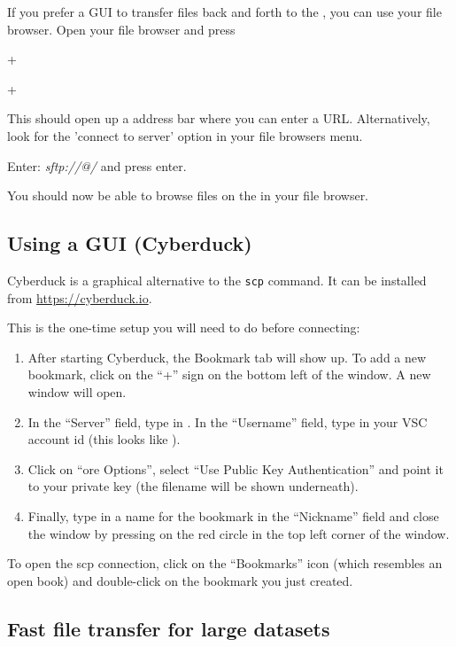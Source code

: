  If you prefer a GUI to transfer files back and forth to the \hpc, you can use your file browser.
  Open your file browser  and press

  \iflinux
     + 
  \fi

  \ifmac
     + 
  \fi

  This should open up a address bar where you can enter a URL. Alternatively, look for the 'connect to server' option in your file browsers menu.

  Enter: \emph{sftp://\userid{}@\loginnode/} and press enter.

  You should now be able to browse files on the \hpc in your file browser.
\fi

\ifmac
  \subsection{Using a GUI (Cyberduck)}

  Cyberduck is a graphical alternative to the \lstinline|scp| command. It can be installed
  from \url{https://cyberduck.io}.

  This is the one-time setup you will need to do before connecting:

  \begin{enumerate}
      \item After starting Cyberduck, the Bookmark tab will show up. To add a new
        bookmark, click on the ``+'' sign on the bottom left of the window. A new window will open.
      \item In the ``Server'' field, type in \texttt{\loginnode}. In the ``Username'' field,
        type in your VSC account id (this looks like \texttt{\userid}).
      \item Click on ``ore Options'', select ``Use Public Key Authentication'' and point
        it to your private key (the filename will be shown underneath).
      \item Finally, type in a name for the bookmark in the ``Nickname'' field and
        close the window by pressing on the red circle in the top left corner of the window.
  \end{enumerate}

  To open the scp connection, click on the ``Bookmarks'' icon (which resembles an
  open book) and double-click on the bookmark you just created.

\fi

\subsection{Fast file transfer for large datasets}

